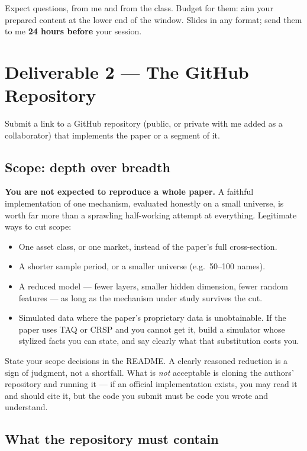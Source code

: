 \documentclass[11pt]{article}
\begin{document}
\noindent
Expect questions, from me and from the class. Budget for them: aim your
prepared content at the lower end of the window. Slides in any format; send
them to me \textbf{24 hours before} your session.

\section*{Deliverable 2 --- The GitHub Repository}

Submit a link to a GitHub repository (public, or private with me added as a
collaborator) that implements the paper or a segment of it.

\subsection*{Scope: depth over breadth}

\textbf{You are not expected to reproduce a whole paper.} A faithful
implementation of one mechanism, evaluated honestly on a small universe, is
worth far more than a sprawling half-working attempt at everything. Legitimate
ways to cut scope:

\begin{itemize}
  \item One asset class, or one market, instead of the paper's full cross-section.
  \item A shorter sample period, or a smaller universe (e.g.\ 50--100 names).
  \item A reduced model --- fewer layers, smaller hidden dimension, fewer
    random features --- as long as the mechanism under study survives the cut.
  \item Simulated data where the paper's proprietary data is unobtainable. If
    the paper uses TAQ or CRSP and you cannot get it, build a simulator whose
    stylized facts you can state, and say clearly what that substitution costs
    you.
\end{itemize}

\noindent
State your scope decisions in the README. A clearly reasoned reduction is a
sign of judgment, not a shortfall. What is \emph{not} acceptable is cloning the
authors' repository and running it --- if an official implementation exists,
you may read it and should cite it, but the code you submit must be code you
wrote and understand.

\subsection*{What the repository must contain}
\end{document}
